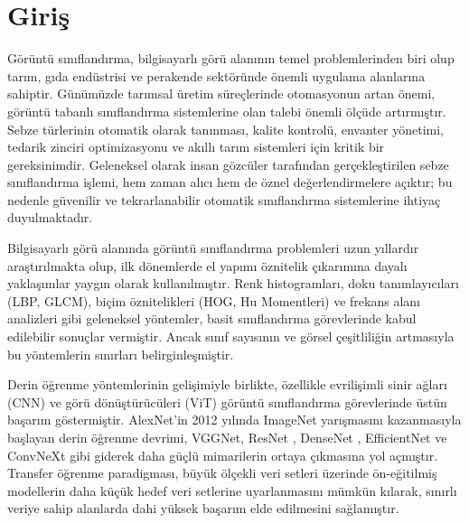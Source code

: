 \documentclass[conference]{IEEEtran}
\begin{document}
\section{Giri\c{s}}
G\"{o}r\"{u}nt\"{u} s{\i}n{\i}fland{\i}rma, bilgisayarl{\i} g\"{o}r\"{u} alan{\i}n{\i}n temel problemlerinden biri olup tar{\i}m, g{\i}da end\"{u}strisi ve perakende sekt\"{o}r\"{u}nde \"{o}nemli uygulama alanlar{\i}na sahiptir. G\"{u}n\"{u}m\"{u}zde tar{\i}msal \"{u}retim s\"{u}re\c{c}lerinde otomasyonun artan \"{o}nemi, g\"{o}r\"{u}nt\"{u} tabanl{\i} s{\i}n{\i}fland{\i}rma sistemlerine olan talebi \"{o}nemli \"{o}l\c{c}\"{u}de art{\i}rm{\i}\c{s}t{\i}r. Sebze t\"{u}rlerinin otomatik olarak tan{\i}nmas{\i}, kalite kontrol\"{u}, envanter y\"{o}netimi, tedarik zinciri optimizasyonu ve ak{\i}ll{\i} tar{\i}m sistemleri i\c{c}in kritik bir gereksinimdir. Geleneksel olarak insan g\"{o}zc\"{u}ler taraf{\i}ndan ger\c{c}ekle\c{s}tirilen sebze s{\i}n{\i}fland{\i}rma i\c{s}lemi, hem zaman al{\i}c{\i} hem de \"{o}znel de\u{g}erlendirmelere a\c{c}{\i}kt{\i}r; bu nedenle g\"{u}venilir ve tekrarlanabilir otomatik s{\i}n{\i}fland{\i}rma sistemlerine ihtiya\c{c} duyulmaktad{\i}r.

Bilgisayarl{\i} g\"{o}r\"{u} alan{\i}nda g\"{o}r\"{u}nt\"{u} s{\i}n{\i}fland{\i}rma problemleri uzun y{\i}llard{\i}r ara\c{s}t{\i}r{\i}lmakta olup, ilk d\"{o}nemlerde el yap{\i}m{\i} \"{o}znitelik \c{c}{\i}kar{\i}m{\i}na dayal{\i} yakla\c{s}{\i}mlar yaygın olarak kullan{\i}lm{\i}\c{s}t{\i}r. Renk histogramlar{\i}, doku tan{\i}mlay{\i}c{\i}lar{\i} (LBP, GLCM), bi\c{c}im \"{o}znitelikleri (HOG, Hu Momentleri) ve frekans alan{\i} analizleri gibi geleneksel y\"{o}ntemler, basit s{\i}n{\i}fland{\i}rma g\"{o}revlerinde kabul edilebilir sonu\c{c}lar vermi\c{s}tir. Ancak s{\i}n{\i}f say{\i}s{\i}n{\i}n ve g\"{o}rsel \c{c}e\c{s}itlili\u{g}in artmas{\i}yla bu y\"{o}ntemlerin s{\i}n{\i}rlar{\i} belirginle\c{s}mi\c{s}tir.

Derin \"{o}\u{g}renme y\"{o}ntemlerinin geli\c{s}imiyle birlikte, \"{o}zellikle evrili\c{s}imli sinir a\u{g}lar{\i} (CNN) \cite{he2016deep} ve g\"{o}r\"{u} d\"{o}n\"{u}\c{s}t\"{u}r\"{u}c\"{u}leri (ViT) \cite{dosovitskiy2020image} g\"{o}r\"{u}nt\"{u} s{\i}n{\i}fland{\i}rma g\"{o}revlerinde \"{u}st\"{u}n ba\c{s}ar{\i}m g\"{o}stermi\c{s}tir. AlexNet'in 2012 y{\i}l{\i}nda ImageNet yar{\i}\c{s}mas{\i}n{\i} kazanmas{\i}yla ba\c{s}layan derin \"{o}\u{g}renme devrimi, VGGNet, ResNet \cite{he2016deep}, DenseNet \cite{huang2017densely}, EfficientNet \cite{tan2021efficientnetv2} ve ConvNeXt \cite{liu2022convnet} gibi giderek daha g\"{u}\c{c}l\"{u} mimarilerin ortaya \c{c}{\i}kmas{\i}na yol a\c{c}m{\i}\c{s}t{\i}r. Transfer \"{o}\u{g}renme paradigmas{\i}, b\"{u}y\"{u}k \"{o}l\c{c}ekli veri setleri \"{u}zerinde \"{o}n-e\u{g}itilmi\c{s} modellerin daha k\"{u}\c{c}\"{u}k hedef veri setlerine uyarlanmas{\i}n{\i} m\"{u}mk\"{u}n k{\i}larak, s{\i}n{\i}rl{\i} veriye sahip alanlarda dahi y\"{u}ksek ba\c{s}ar{\i}m elde edilmesini sa\u{g}lam{\i}\c{s}t{\i}r.
\end{document}
